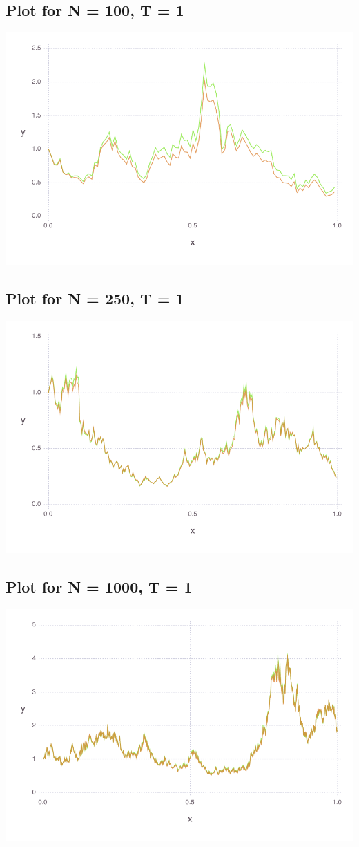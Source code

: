 \documentclass[a4paper,12pt]{article}
\begin{document}
\subsection*{Plot for N = 100, T = 1}
\includegraphics[width=\linewidth]{figures/problemset_2_1.pdf}



\subsection*{Plot for N = 250, T = 1}
\includegraphics[width=\linewidth]{figures/problemset_3_1.pdf}



\subsection*{Plot for N = 1000, T = 1}
\includegraphics[width=\linewidth]{figures/problemset_4_1.pdf}
\end{document}
